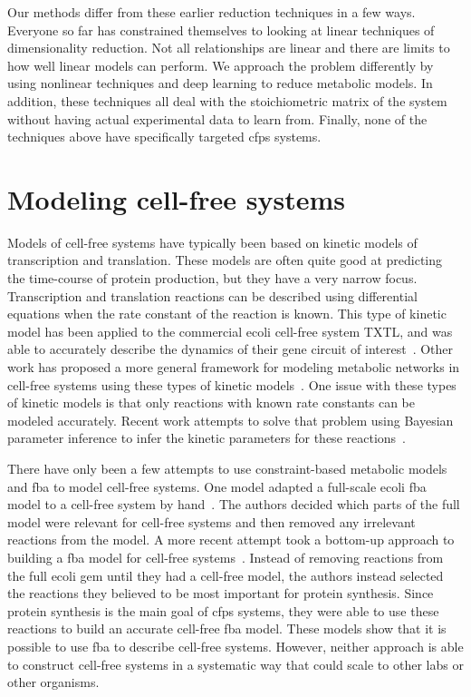 Our methods differ from these earlier reduction techniques in a few ways.
Everyone so far has constrained themselves to looking at linear techniques of dimensionality reduction.
Not all relationships are linear and there are limits to how well linear models can perform.
We approach the problem differently by using nonlinear techniques and deep learning to reduce metabolic models.
In addition, these techniques all deal with the stoichiometric matrix of the system without having actual experimental data to learn from.
Finally, none of the techniques above have specifically targeted \gls{cfps} systems.

\section{Modeling cell-free systems}\label{rw:mod-cf}
Models of cell-free systems have typically been based on kinetic models of transcription and translation.
These models are often quite good at predicting the time-course of protein production, but they have a very narrow focus.
Transcription and translation reactions can be described using differential equations when the rate constant of the reaction is known.
This type of kinetic model has been applied to the commercial \gls{ecoli} cell-free system TXTL, and was able to accurately describe the dynamics of their gene circuit of interest~\cite{tuza2013silico}.
Other work has proposed a more general framework for modeling metabolic networks in cell-free systems using these types of kinetic models~\cite{wayman2015dynamic}.
One issue with these types of kinetic models is that only reactions with known rate constants can be modeled accurately.
Recent work attempts to solve that problem using Bayesian parameter inference to infer the kinetic parameters for these reactions~\cite{moore2018rapid}.

There have only been a few attempts to use constraint-based metabolic models and \gls{fba} to model cell-free systems.
One model adapted a full-scale \gls{ecoli} \gls{fba} model to a cell-free system by hand~\cite{bujara2012silico}.
The authors decided which parts of the full model were relevant for cell-free systems and then removed any irrelevant reactions from the model.
A more recent attempt took a bottom-up approach to building a \gls{fba} model for cell-free systems~\cite{vilkhovoy2017sequence}.
Instead of removing reactions from the full \gls{ecoli} \gls{gem} until they had a cell-free model, the authors instead selected the reactions they believed to be most important for protein synthesis.
Since protein synthesis is the main goal of \gls{cfps} systems, they were able to use these reactions to build an accurate cell-free \gls{fba} model.
These models show that it is possible to use \gls{fba} to describe cell-free systems.
However, neither approach is able to construct cell-free systems in a systematic way that could scale to other labs or other organisms.

